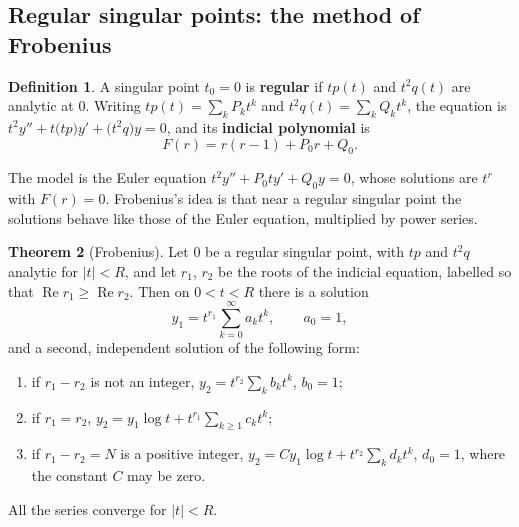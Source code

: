 \documentclass[11pt,a4paper]{article}
\numberwithin{equation}{section}
\DeclareMathOperator{\Real}{Re}
\theoremstyle{definition}
\newtheorem{thm}{Theorem}[subsection]
\newtheorem{defn}[thm]{Definition}
\begin{document}
\subsection{Regular singular points: the method of Frobenius}
\label{ssec:frobenius}

\begin{defn}
A singular point $t_0 = 0$ is \textbf{regular} if $tp(t)$ and $t^2q(t)$ are analytic at $0$. Writing $tp(t) = \sum_kP_kt^k$ and $t^2q(t) = \sum_kQ_kt^k$, the equation is $t^2y'' + t\bigl(tp\bigr)y' + \bigl(t^2q\bigr)y = 0$, and its
\textbf{indicial polynomial} is
\[
F(r) = r(r - 1) + P_0r + Q_0 .
\]
\end{defn}

The model is the Euler equation $t^2y'' + P_0ty' + Q_0y = 0$, whose solutions are $t^r$ with $F(r) = 0$. Frobenius's idea is that near a regular singular point the solutions behave like those of
the Euler equation, multiplied by power series.

\begin{thm}[Frobenius]
\label{thm:frobenius}
Let $0$ be a regular singular point, with $tp$ and $t^2q$ analytic for $|t| < R$, and let $r_1$, $r_2$ be the roots of the indicial equation, labelled so that $\Real r_1 \geq \Real r_2$. Then on
$0 < t < R$ there is a solution
\[
y_1 = t^{r_1}\sum_{k=0}^\infty a_kt^k, \qquad a_0 = 1 ,
\]
and a second, independent solution of the following form:
\begin{enumerate}[label=(\roman*)]
\item if $r_1 - r_2$ is not an integer, $y_2 = t^{r_2}\sum_kb_kt^k$, $b_0 = 1$;
\item if $r_1 = r_2$, $y_2 = y_1\log t + t^{r_1}\sum_{k\geq1}c_kt^k$;
\item if $r_1 - r_2 = N$ is a positive integer, $y_2 = Cy_1\log t + t^{r_2}\sum_kd_kt^k$, $d_0 = 1$, where the constant $C$ may be zero.
\end{enumerate}
All the series converge for $|t| < R$.
\end{thm}
\end{document}
